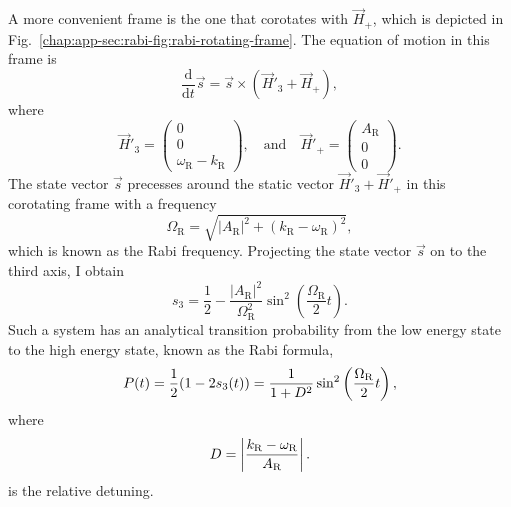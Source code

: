 


A more convenient frame is the one that corotates with $\vec{H}_+$, which is depicted in Fig.~\ref{chap:app-sec:rabi-fig:rabi-rotating-frame}. The equation of motion in this frame is
\begin{equation}
\frac{\mathrm d}{\mathrm d t } \vec{s} = \vec{s} \times (\vec{H}'_3 + \vec{H}_+),
\end{equation}
where
\begin{equation}
\vec{H}'_3 = \begin{pmatrix}
    0 \\ 0 \\ 　\omega_{\mathrm{R}} - k_{\mathrm R}
  \end{pmatrix}, \quad \text{and} \quad \vec{H}'_+ = \begin{pmatrix}
    A_{\mathrm{R}} \\ 0 \\ 　0
    \end{pmatrix}.
\end{equation}
The state vector $\vec{s}$ precesses around the static vector $\vec{H}'_3 + \vec{H}'_+$ in this corotating frame with a frequency
\begin{equation}
    \Omega_{\mathrm R} = \sqrt{ \lvert A_{\mathrm{R}}\rvert^2 + (k_{\mathrm{R}} - \omega_{\mathrm R})^2 },
    \label{app:rabi-frequency}
\end{equation}
which is known as the Rabi frequency.
Projecting the state vector $\vec{s}$ on to the third axis, I obtain
\begin{equation}
s_3 = \frac{1}{2} - \frac{\lvert A_{\mathrm R}\rvert ^2}{\Omega_{\mathrm R}^2}\sin^2\left(\frac{\Omega_{\mathrm R}}{2} t\right).
\end{equation}
Such a system has an analytical transition probability from the low energy state to the high energy state, known as the Rabi formula,
\begin{equation}
    P(t) = \frac{1}{2}(1- 2 s_3(t))= \frac{1}{ 1 + \RD^2 } \sin^2 \left( \frac{\Omega_{\mathrm R}}{2} t \right),
    \label{app:rabi-system-transition-probability}
\end{equation}
where 
\begin{equation}
    \RD = \left\lvert \frac{ k_{\mathrm R} - \omega_{\mathrm R}}{A_{\mathrm R}} \right\rvert.
    \label{chap:app-sec:rabi-oscillations-eqn:relative-detuning-def}
\end{equation}
is the relative detuning.

